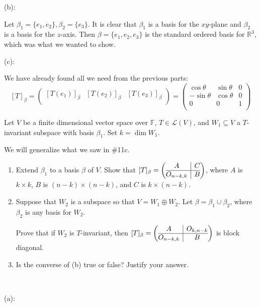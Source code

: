 \documentclass{eh-homework}
\begin{document}
\begin{question}{11}
        \medskip

        (b):

        Let \(\beta_1 = \{ e_1, e_2 \}, \beta _2 = \{ e_3 \}\). It is clear that \(\beta _1\) is a basis for the \(xy\)-plane and \(\beta _2\) is a basis for the \(z\)-axis. Then \(\beta = \{ e_1, e_2, e_3 \}\) is the standard ordered basis for \(\mathbb{R}^3\), which was what we wanted to show.

        \medskip

        (c):

        We have already found all we need from the previous parts:
        \[
            [T]_\beta = \begin{pmatrix}
                [T(e_1)]_\beta & [T(e_2)]_\beta &  [T(e_3)]_\beta \\
            \end{pmatrix}
            =
            \begin{pmatrix}
                \cos \theta & \sin \theta &  0 \\
                -\sin \theta & \cos \theta &  0 \\
                0 & 0 &  1 \\
            \end{pmatrix}
        \]
    \end{question}

    \begin{question}{12}
        Let \( V \) be a finite dimensional vector space over \( \mathbb{F} \), \( T \in \mathcal{L}(V) \), and \( W_1 \subseteq V \) a \( T \)-invariant subspace with basis \( \beta_1 \). Set \( k = \dim W_1 \).

        We will generalize what we saw in \#11c.

        \begin{enumerate}[label=(\alph*)]
            \item Extend \( \beta_1 \) to a basis \( \beta \) of \( V \). Show that \( [T]_\beta = \left(\begin{array}{@{}c|c@{}} A & C \\ \hline O_{n-k,k} & B \end{array} \right)\), where \( A \) is \( k \times k \), \( B \) is \( (n-k) \times (n-k) \), and \( C \) is \( k \times (n-k) \).
            \item Suppose that \( W_2 \) is a subspace so that \( V = W_1 \oplus W_2 \). Let \( \beta = \beta_1 \cup \beta_2 \), where \( \beta_2 \) is any basis for \( W_2 \).

            Prove that if \( W_2 \) is \( T \)-invariant, then \( [T]_\beta = \left(\begin{array}{@{}c|c@{}} A & O_{k,n-k} \\ \hline O_{n-k,k} & B \end{array}\right) \) is block diagonal.
            \item Is the converse of (b) true or false? Justify your answer.
        \end{enumerate}
        \tcblower
        \ 

        (a):


    \end{question}
\end{document}
